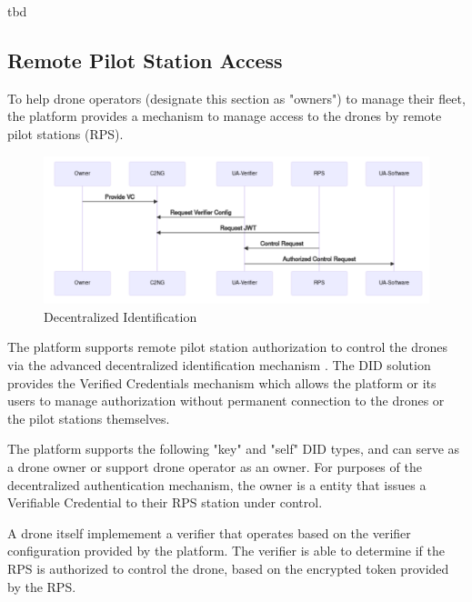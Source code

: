 \documentclass[a4paper,conference]{IEEEtran}
\begin{document}
tbd

\subsection{Remote Pilot Station Access}

To help drone operators (designate this section as "owners") to manage their fleet, the platform provides a mechanism to manage access to the drones by remote pilot stations (RPS).

\begin{figure}[!ht]
\centering
\includegraphics[width=0.9\linewidth]{images/did.png}
\caption{Decentralized Identification}\label{fig:did}
\end{figure}

The platform supports remote pilot station authorization to control the drones via the advanced decentralized identification mechanism \cite{excid:did}. The DID solution provides the Verified Credentials mechanism which allows the platform or its users to manage authorization without permanent connection to the drones or the pilot stations themselves.

The platform supports the following "key" and "self" DID types, and can serve as a drone owner or support drone operator as an owner. For purposes of the decentralized authentication mechanism, the owner is a entity that issues a Verifiable Credential to their RPS station under control.

A drone itself implemement a verifier that operates based on the verifier configuration provided by the platform. The verifier is able to determine if the RPS is authorized to control the drone, based on the encrypted token provided by the RPS.

\end{document}

